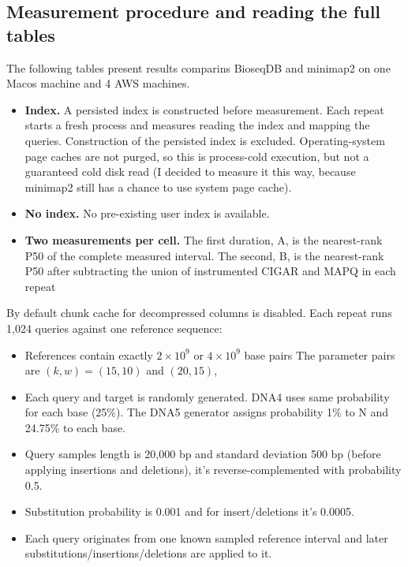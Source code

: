 \subsection{Measurement procedure and reading the full tables}
\label{sec:benchmark-results}

The following tables present results comparins BioseqDB and minimap2 on one Macos machine and 4 AWS machines.

\begin{itemize}
  \item \textbf{Index.} A persisted index is constructed before measurement.
  Each repeat starts a fresh process and measures reading the index and mapping
  the queries. Construction of the persisted index is excluded. Operating-system page caches are not purged, so
  this is process-cold execution, but not a guaranteed cold disk read (I decided to measure it this way, because minimap2 still has a chance to use system page cache).
  \item \textbf{No index.} No pre-existing user index is available.
  \item \textbf{Two measurements per cell.} The first duration, A, is the
  nearest-rank P50 of the complete measured interval. The second, B, is the
  nearest-rank P50 after subtracting the union of instrumented CIGAR
  and MAPQ in each repeat
\end{itemize}

By default chunk cache for decompressed columns is disabled.
Each repeat runs 1,024 queries against one reference sequence:
\begin{itemize}
  \item References contain exactly
  $2\times10^9$ or $4\times10^9$ base pairs
  The parameter pairs are $(k,w)=(15,10)$ and $(20,15)$,
  \item Each query and target is randomly generated. DNA4 uses same probability for each base (25\%). The DNA5
  generator assigns probability 1\% to N and 24.75\% to each base.
  \item Query samples length is 20,000 bp and standard deviation 500 bp (before applying insertions and deletions), it's reverse-complemented with probability 0.5.
  \item Substitution probability is 0.001 and for insert/deletions it's 0.0005.
  \item Each query originates from one known sampled
  reference interval and later substitutions/insertions/deletions are applied to it.
\end{itemize}

